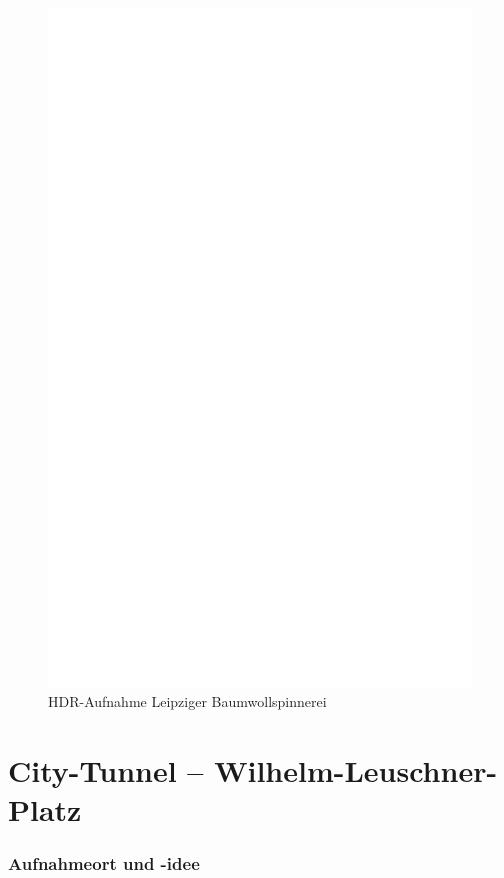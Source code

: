 \documentclass[liststotoc,bibtotoc,fontsize=14pt,]{scrreprt}
\begin{document}
	\newpage
	\begin{figure}[h]
		\includegraphics[width=\linewidth]{img/ph.jpg}
		\caption{HDR-Aufnahme Leipziger Baumwollspinnerei}
	\end{figure}

	
	\section{City-Tunnel -- Wilhelm-Leuschner-Platz }
	\label{sec:tunnel}
	\subsubsection{Aufnahmeort und -idee}
	
\end{document}
